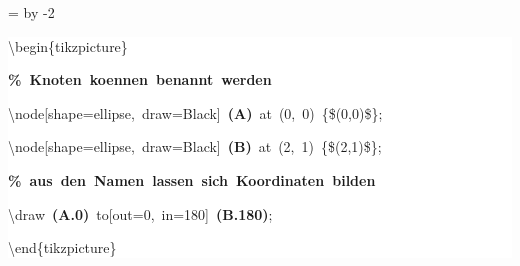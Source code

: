 \begingroup
\ttfamily
{}
=\textwidth
\advance{} by -2\fboxsep
\noindent
\colorbox{background}
{%
\parbox{\dimen255}
{%
\rule[-0.5ex]{0pt}{2.5ex}\hspace*{0.0em}\textbackslash{}begin\{tikzpicture\}\\
\rule[-0.5ex]{0pt}{2.5ex}\hspace*{1.0em}\textcolor{G}{\textbf{\%~Knoten~koennen~benannt~werden}}\\
\rule[-0.5ex]{0pt}{2.5ex}\hspace*{1.0em}\textbackslash{}node[shape=ellipse,~draw=Black]~\textcolor{R}{\textbf{(A)}}~at~(0,~0)~\{\$(0,0)\$\};\\
\rule[-0.5ex]{0pt}{2.5ex}\hspace*{1.0em}\textbackslash{}node[shape=ellipse,~draw=Black]~\textcolor{R}{\textbf{(B)}}~at~(2,~1)~\{\$(2,1)\$\};\\
\rule[-0.5ex]{0pt}{2.5ex}\hspace*{1.0em}\textcolor{G}{\textbf{\%~aus~den~Namen~lassen~sich~Koordinaten~bilden}}\\
\rule[-0.5ex]{0pt}{2.5ex}\hspace*{1.0em}\textbackslash{}draw~\textcolor{R}{\textbf{(A.0)}}~to[out=0,~in=180]~\textcolor{R}{\textbf{(B.180)}};\\
\rule[-0.5ex]{0pt}{2.5ex}\hspace*{0.0em}\textbackslash{}end\{tikzpicture\}}%
}%
\endgroup
